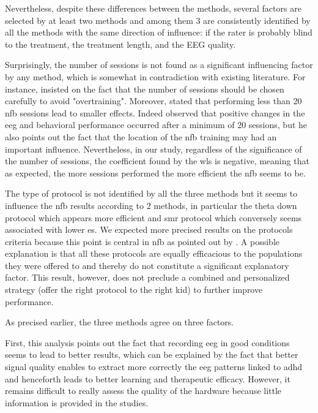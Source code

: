 Nevertheless, despite these differences between the methods, several factors are selected by at least two methods and among them 3 are
consistently identified by all the methods with the same direction of influence: if the rater is probably blind to the treatment, the
treatment length, and the EEG quality. 

Surprisingly, the number of sessions is not found as a significant influencing factor by any method, 
which is somewhat in contradiction with existing literature. For instance, \citet{Enriquez2017} insisted on the 
fact that the number of sessions should be chosen carefully to avoid "overtraining". Moreover, \citet{Arns2014} stated that 
performing less than 20 \gls{nfb} sessions lead to smaller effects. Indeed \citet{Vernon2004} observed that positive 
changes in the \gls{eeg} and behavioral performance occurred after a minimum of 20 sessions, but he also points out the fact that the
location of the \gls{nfb} training may had an important influence. Nevertheless, in our study, regardless of the significance of 
the number of sessions, the coefficient found by the \gls{wls} is negative, meaning that as expected,
the more sessions performed the more efficient the \gls{nfb} seems to be. 

The type of protocol is not identified by all the three methods but it seems to influence the \gls{nfb} results according to 2 methods,  
in particular the theta down protocol which appears more efficient and \gls{smr} protocol which conversely seems associated with lower \gls{es}. We expected 
more precised results on the protocols criteria because this point is central in \gls{nfb} as pointed out by \citet{Vernon2004}.
A possible explanation is that all these protocols are equally efficacious to the populations they were offered to and 
thereby do not constitute a significant explanatory factor. This result, however, does not preclude a combined and personalized strategy 
(offer the right protocol to the right kid) to further improve performance. 

As precised earlier, the three methods agree on three factors.

First, this analysis points out the fact that recording \gls{eeg} in good conditions seems to lead to better results, 
which can be explained by the fact that better signal quality enables to extract more correctly the \gls{eeg} 
patterns linked to \gls{adhd} and henceforth leads to better learning and therapeutic efficacy. However, it remains difficult to 
really assess the quality of the hardware because little information is provided in the studies.  

